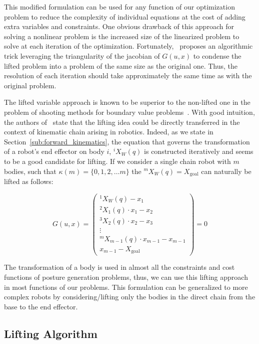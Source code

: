 This modified formulation can be used for any function of our optimization problem to reduce the complexity of individual equations at the cost of adding extra variables and constraints.
One obvious drawback of this approach for solving a nonlinear problem is the increased size of the linearized problem to solve at each iteration of the optimization.
Fortunately,~\cite{Albersmeyer:2010:LNM:1958447.1958472} proposes an algorithmic trick leveraging the triangularity of the jacobian of $G(u,x)$ to condense the lifted problem into a problem of the same size as the original one.
Thus, the resolution of each iteration should take approximately the same time as with the original problem.

The lifted variable approach is known to be superior to the non-lifted one in the problem of shooting methods for boundary value problems~\cite{osborne:1969:shooting}.
With good intuition, the authors of~\cite{Albersmeyer:2010:LNM:1958447.1958472} state that the lifting idea could be directly transferred in the context of kinematic chain arising in robotics.
Indeed, as we state in Section~\ref{sub:forward_kinematics}, the equation that governs the transformation of a robot's end effector on body $i$, ${}^i X_W(q)$ is constructed iteratively and seems to be a good candidate for lifting.
If we consider a single chain robot with $m$ bodies, such that $\kappa (m) = \{0, 1, 2, \ldots m\}$ the ${}^m X_W(q) = X_\text{goal}$ can naturally be lifted as follows:

\begin{equation}
\label{eq:robot_lift}
  G(u,x) =
  \begin{pmatrix}
  {}^1 X_W(q) - x_1 \\
  {}^2 X_1(q)\cdot x_1 - x_2\\
  {}^3 X_2(q)\cdot x_2 - x_3 \\
  \vdots \\
  {}^m X_{m-1}(q)\cdot x_{m-1} - x_{m-1} \\
  x_{m-1} - X_\text{goal}
  \end{pmatrix}
  =0
\end{equation}

The transformation of a body is used in almost all the constraints and cost functions of posture generation problems, thus, we can use this lifting approach in most functions of our problems.
This formulation can be generalized to more complex robots by considering/lifting only the bodies in the direct chain from the base to the end effector.

\subsection{Lifting Algorithm}
\label{subsec:LiftingAlgorithm}

